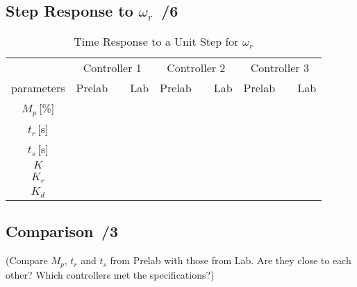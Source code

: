 \documentclass{article}
\newcommand{\score}{\hfill \underline{\hspace{0.65cm}}\,/} %
\begin{document}
\subsection{Step Response to $\omega_r$ \score 6}
\begin{table}[phtb]\footnotesize
\begin{center}
\caption{Time Response to a Unit Step for $\omega_r$}
 \label{tbl:lab3_q1}
\begin{tabular}{c|m{.85cm}|m{.85cm}|m{.85cm}|m{.85cm}|m{.85cm}|m{.85cm}} \hline \hline
\cellcolor{lightgray} & \multicolumn{2}{c|}{\cellcolor{lightgray}Controller 1} & \multicolumn{2}{c|}{\cellcolor{lightgray}Controller 2}  & \multicolumn{2}{c}{\cellcolor{lightgray}Controller 3}  \\ \cline{2-7}
\multirow{-2}{*}{\cellcolor{lightgray}parameters}& Prelab & ~~Lab & Prelab & ~~Lab & Prelab &~~Lab \\ \hline
$M_p$\,[\%] & & & & & & \\ \hline
$t_r$\,[s] & & & & & & \\ \hline
$t_s$\,[s] & & & & & & \\ \hline
$K$  &\multicolumn{2}{c|}{}&\multicolumn{2}{c|}{}&\multicolumn{2}{c}{} \\ \hline
$K_r$  &\multicolumn{2}{c|}{}&\multicolumn{2}{c|}{}&\multicolumn{2}{c}{} \\ \hline
$K_d$  &\multicolumn{2}{c|}{}&\multicolumn{2}{c|}{}&\multicolumn{2}{c}{} \\ \hline
\end{tabular}
\end{center}
\end{table}

\subsection{Comparison \score 3}
(Compare $M_p$, $t_r$ and $t_s$ from Prelab with those from Lab. Are they close to each other? Which controllers met the specifications?)
\end{document}
